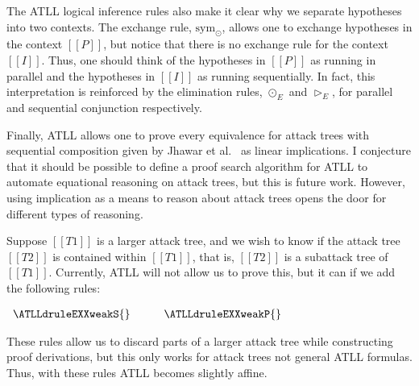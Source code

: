The ATLL logical inference rules also make it clear why we separate
hypotheses into two contexts.  The exchange rule, $\text{sym}_\odot$,
allows one to exchange hypotheses in the context $[[P]]$, but notice
that there is no exchange rule for the context $[[I]]$.  Thus, one
should think of the hypotheses in $[[P]]$ as running in parallel and
the hypotheses in $[[I]]$ as running sequentially.  In fact, this
interpretation is reinforced by the elimination rules, $\odot_E$ and
$\rhd_E$, for parallel and sequential conjunction respectively.

Finally, ATLL allows one to prove every equivalence for attack trees
with sequential composition given by Jhawar et al.~\cite{Jhawar:2015}
as linear implications.  I conjecture that it should be possible to
define a proof search algorithm for ATLL to automate equational
reasoning on attack trees, but this is future work.  However, using
implication as a means to reason about attack trees opens the door for
different types of reasoning.

Suppose $[[T1]]$ is a larger attack tree, and we wish to know if the
attack tree $[[T2]]$ is contained within $[[T1]]$, that is, $[[T2]]$
is a subattack tree of $[[T1]]$.  Currently, ATLL will not allow us to
prove this, but it can if we add the following rules:
\begin{center}
  \begin{math}
    \begin{array}{lll}
      \ATLLdruleEXXweakS{} & \quad & \ATLLdruleEXXweakP{}
    \end{array}
  \end{math}
\end{center}
These rules allow us to discard parts of a larger attack tree while
constructing proof derivations, but this only works for attack trees
not general ATLL formulas.  Thus, with these rules ATLL becomes
slightly affine.
